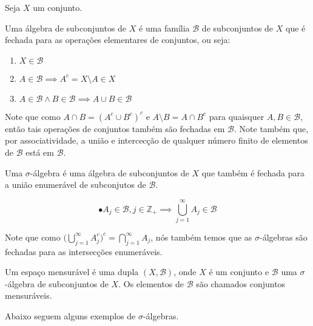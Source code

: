 Seja $X$ um conjunto. 

\begin{definicao}
    
    Uma álgebra de subconjuntos de $X$ é uma família $\mathcal{B}$ de subconjuntos de $X$
    que é fechada para as operações elementares de conjuntos, ou seja: 
    
    \begin{enumerate}[label=(\roman*)]
        \item $X \in \mathcal{B}$
        \item $A \in \mathcal{B} \implies A^c = X \setminus A \in X$
        \item $A \in \mathcal{B} \land B \in \mathcal{B} \implies A \cup B \in \mathcal{B}$
    \end{enumerate}

    Note que como $ A \cap B = (A^c \cup B^c)^c $ e $A \setminus B = A \cap B^c$ para 
    quaisquer $A,B \in \mathcal{B}$, então tais operações de conjuntos também são fechadas 
    em $\mathcal{B}$. Note também que, por associatividade, a união e intercecção de qualquer
    número finito de elementos de $\mathcal{B}$ está em $\mathcal{B}$.

\end{definicao}

\begin{definicao}
    
    Uma $\sigma$-álgebra é uma álgebra de subconjuntos de $X$ que também é fechada para a 
    união enumerável de subconjutos de $\mathcal{B}$.

    \[ \bullet A_j \in \mathcal{B}, j \in \mathbb{Z}_+ \implies \bigcup _{j=1} ^{\infty} A_j \in \mathcal{B} \]

    Note que como \( \bigg(\bigcup _{j=1} ^{\infty} A_j ^c \bigg) ^c =
    \bigcap _{j=1} ^{\infty} A_j \), nós também temos que as $\sigma$-álgebras são fechadas 
    para as intersecções enumeráveis.

\end{definicao}

\begin{definicao}
    
    Um espaço mensurável é uma dupla $(X,\mathcal{B})$, onde $X$ é um conjunto e $\mathcal{B}$
    uma $\sigma$-álgebra de subconjuntos de $X$. Os elementos de $\mathcal{B}$ são chamados 
    conjuntos mensuráveis. 

\end{definicao}
    
    Abaixo seguem alguns exemplos de $\sigma$-álgebras.

